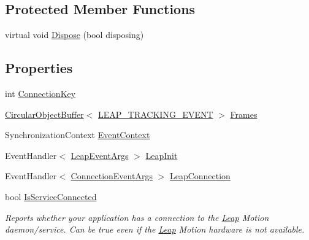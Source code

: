 \subsection*{Protected Member Functions}
\begin{DoxyCompactItemize}
\item 
virtual void \mbox{\hyperlink{class_leap_internal_1_1_connection_a64cbbc4a16c8719a250dac019872556d}{Dispose}} (bool disposing)
\end{DoxyCompactItemize}
\subsection*{Properties}
\begin{DoxyCompactItemize}
\item 
int \mbox{\hyperlink{class_leap_internal_1_1_connection_a57ca44db295ca2da43050d4eb608e23c}{Connection\+Key}}
\item 
\mbox{\hyperlink{class_leap_internal_1_1_circular_object_buffer}{Circular\+Object\+Buffer}}$<$ \mbox{\hyperlink{struct_leap_internal_1_1_l_e_a_p___t_r_a_c_k_i_n_g___e_v_e_n_t}{L\+E\+A\+P\+\_\+\+T\+R\+A\+C\+K\+I\+N\+G\+\_\+\+E\+V\+E\+NT}} $>$ \mbox{\hyperlink{class_leap_internal_1_1_connection_a96db7c09526d9f356b88c0c9fe2dea25}{Frames}}
\item 
Synchronization\+Context \mbox{\hyperlink{class_leap_internal_1_1_connection_a0b87a8b7adf1357944915bd206150db3}{Event\+Context}}
\item 
Event\+Handler$<$ \mbox{\hyperlink{class_leap_1_1_leap_event_args}{Leap\+Event\+Args}} $>$ \mbox{\hyperlink{class_leap_internal_1_1_connection_a4ecba08b7b5d52a5d3c9822454cd1633}{Leap\+Init}}
\item 
Event\+Handler$<$ \mbox{\hyperlink{class_leap_1_1_connection_event_args}{Connection\+Event\+Args}} $>$ \mbox{\hyperlink{class_leap_internal_1_1_connection_a73e39e15e464b1c0b8a5394ecd085986}{Leap\+Connection}}
\item 
bool \mbox{\hyperlink{class_leap_internal_1_1_connection_a29fc660760e7b7de559f01aa11be1abe}{Is\+Service\+Connected}}
\begin{DoxyCompactList}\small\item\em Reports whether your application has a connection to the \mbox{\hyperlink{namespace_leap}{Leap}} Motion daemon/service. Can be true even if the \mbox{\hyperlink{namespace_leap}{Leap}} Motion hardware is not available. \end{DoxyCompactList}\item 

\end{DoxyCompactItemize}
